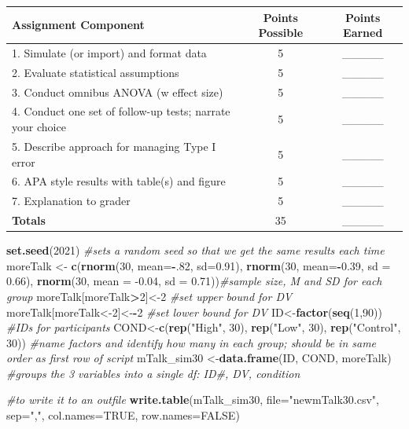 \documentclass[
  english,
]{book}
\newenvironment{Shaded}{\begin{snugshade}}{\end{snugshade}}
\newcommand{\CommentTok}[1]{\textcolor[rgb]{0.56,0.35,0.01}{\textit{#1}}}
\newcommand{\DataTypeTok}[1]{\textcolor[rgb]{0.13,0.29,0.53}{#1}}
\newcommand{\DecValTok}[1]{\textcolor[rgb]{0.00,0.00,0.81}{#1}}
\newcommand{\FloatTok}[1]{\textcolor[rgb]{0.00,0.00,0.81}{#1}}
\newcommand{\KeywordTok}[1]{\textcolor[rgb]{0.13,0.29,0.53}{\textbf{#1}}}
\newcommand{\NormalTok}[1]{#1}
\newcommand{\OperatorTok}[1]{\textcolor[rgb]{0.81,0.36,0.00}{\textbf{#1}}}
\newcommand{\OtherTok}[1]{\textcolor[rgb]{0.56,0.35,0.01}{#1}}
\newcommand{\StringTok}[1]{\textcolor[rgb]{0.31,0.60,0.02}{#1}}
\begin{document}
\begin{longtable}[]{@{}lcc@{}}
\toprule
Assignment Component & Points Possible & Points Earned\tabularnewline
\midrule
\endhead
1. Simulate (or import) and format data & 5 & \_\_\_\_\_\tabularnewline
2. Evaluate statistical assumptions & 5 & \_\_\_\_\_\tabularnewline
3. Conduct omnibus ANOVA (w effect size) & 5 & \_\_\_\_\_\tabularnewline
4. Conduct one set of follow-up tests; narrate your choice & 5 & \_\_\_\_\_\tabularnewline
5. Describe approach for managing Type I error & 5 & \_\_\_\_\_\tabularnewline
6. APA style results with table(s) and figure & 5 & \_\_\_\_\_\tabularnewline
7. Explanation to grader & 5 & \_\_\_\_\_\tabularnewline
\textbf{Totals} & 35 & \_\_\_\_\_\tabularnewline
\bottomrule
\end{longtable}

\begin{Shaded}
\begin{Highlighting}[]
\KeywordTok{set.seed}\NormalTok{(}\DecValTok{2021}\NormalTok{) }\CommentTok{#sets a random seed so that we get the same results each time}
\NormalTok{moreTalk <-}\StringTok{ }\KeywordTok{c}\NormalTok{(}\KeywordTok{rnorm}\NormalTok{(}\DecValTok{30}\NormalTok{, }\DataTypeTok{mean=}\OperatorTok{-}\NormalTok{.}\DecValTok{82}\NormalTok{, }\DataTypeTok{sd=}\FloatTok{0.91}\NormalTok{), }\KeywordTok{rnorm}\NormalTok{(}\DecValTok{30}\NormalTok{, }\DataTypeTok{mean=}\OperatorTok{-}\FloatTok{0.39}\NormalTok{, }\DataTypeTok{sd =} \FloatTok{0.66}\NormalTok{), }\KeywordTok{rnorm}\NormalTok{(}\DecValTok{30}\NormalTok{, }\DataTypeTok{mean =} \FloatTok{-0.04}\NormalTok{, }\DataTypeTok{sd =} \FloatTok{0.71}\NormalTok{))}\CommentTok{#sample size, M and SD for each group}
\NormalTok{moreTalk[moreTalk}\OperatorTok{>}\DecValTok{2}\NormalTok{]<-}\DecValTok{2} \CommentTok{#set upper bound for DV}
\NormalTok{moreTalk[moreTalk<-}\DecValTok{2}\NormalTok{]<-}\OperatorTok{-}\DecValTok{2} \CommentTok{#set lower bound for DV}
\NormalTok{ID<-}\KeywordTok{factor}\NormalTok{(}\KeywordTok{seq}\NormalTok{(}\DecValTok{1}\NormalTok{,}\DecValTok{90}\NormalTok{)) }\CommentTok{#IDs for participants}
\NormalTok{COND<-}\KeywordTok{c}\NormalTok{(}\KeywordTok{rep}\NormalTok{(}\StringTok{"High"}\NormalTok{, }\DecValTok{30}\NormalTok{), }\KeywordTok{rep}\NormalTok{(}\StringTok{"Low"}\NormalTok{, }\DecValTok{30}\NormalTok{), }\KeywordTok{rep}\NormalTok{(}\StringTok{"Control"}\NormalTok{, }\DecValTok{30}\NormalTok{)) }\CommentTok{#name factors and identify how many in each group; should be in same order as first row of script}
\NormalTok{mTalk_sim30 <-}\KeywordTok{data.frame}\NormalTok{(ID, COND, moreTalk) }\CommentTok{#groups the 3 variables into a single df:  ID#, DV, condition}

\CommentTok{#to write it to an outfile}
\KeywordTok{write.table}\NormalTok{(mTalk_sim30, }\DataTypeTok{file=}\StringTok{"newmTalk30.csv"}\NormalTok{, }\DataTypeTok{sep=}\StringTok{","}\NormalTok{, }\DataTypeTok{col.names=}\OtherTok{TRUE}\NormalTok{, }\DataTypeTok{row.names=}\OtherTok{FALSE}\NormalTok{)}
\end{Highlighting}
\end{Shaded}
\end{document}
